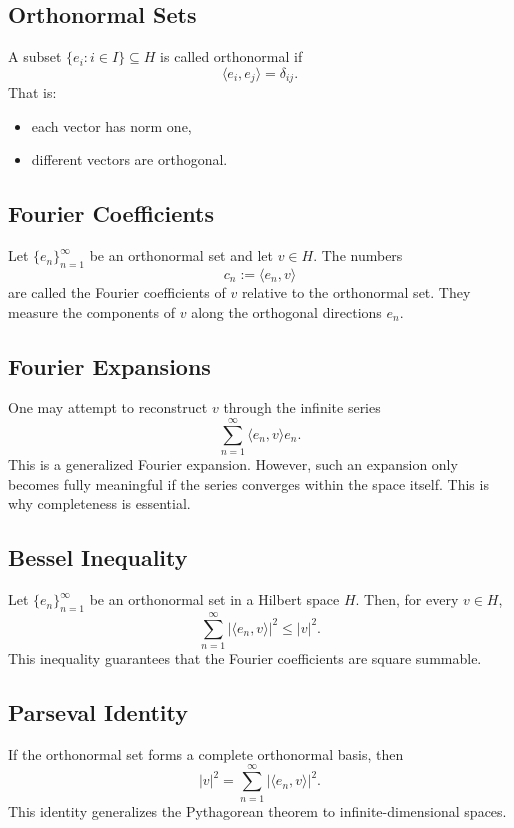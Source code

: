 \documentclass[aps,prl,twocolumn,groupedaddress]{revtex4-2}
\begin{document}
\subsection{Orthonormal Sets}

A subset $\{e_i:i\in I\}\subseteq H$ is called orthonormal if
$$
\langle e_i,e_j\rangle=
\delta_{ij}.
$$
That is:
\begin{itemize}
\item each vector has norm one,
\item different vectors are orthogonal.
\end{itemize}

\subsection{Fourier Coefficients}

Let $\{e_n\}_{n=1}^\infty$ be an orthonormal set and let $v\in H$.
The numbers
$$
c_n:=\langle e_n,v\rangle
$$
are called the Fourier coefficients of $v$ relative to the orthonormal set.
They measure the components of $v$ along the orthogonal directions $e_n$.

\subsection{Fourier Expansions}

One may attempt to reconstruct $v$ through the infinite series
$$
\sum_{n=1}^\infty
\langle e_n,v\rangle e_n.
$$
This is a generalized Fourier expansion.
However, such an expansion only becomes fully meaningful if the series converges within the space itself.
This is why completeness is essential.

\subsection{Bessel Inequality}

Let $\{e_n\}_{n=1}^\infty$  be an orthonormal set in a Hilbert space $H$.
Then, for every $v\in H$,
$$
\sum_{n=1}^\infty
|\langle e_n,v\rangle|^2
\leq
|v|^2.
$$
This inequality guarantees that the Fourier coefficients are square summable.

\subsection{Parseval Identity}

If the orthonormal set forms a complete orthonormal basis, then
$$
|v|^2
=
\sum_{n=1}^\infty
|\langle e_n,v\rangle|^2.
$$
This identity generalizes the Pythagorean theorem to infinite-dimensional spaces.
\end{document}
